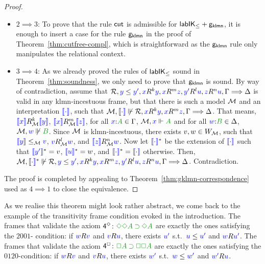 \documentclass[a4paper]{article}
\begin{document}
\begin{proof}
\begin{itemize}
		\item $2 \implies 3$:
		To prove that the rule $\rn{cut}$ is admissible for $\labIKp + \gklmn$, it is enough to insert a case for the rule $\gklmn$ in the proof of Theorem~\ref{thm:cutfree-compl}, which
		is straightforward as the $\gklmn$ rule only manipulates the relational context.
		
		\item $3 \implies 4$:
		As we already proved the rules of $\labIKp$ sound in Theorem~\ref{thm:soundness}, we only need to prove that $\gklmn$ is sound.
		By way of contradiction, assume that $\B, \futs{y}{y'}, \lb x R^{k} \lb y, \lb x R^{m} \lb z, \lb{y'}R^{l} \lb u, \lb z R^{n} \lb u, \Left\SEQ\Right$ is valid in any klmn-incestuous frame,
		but that there is such a model $\M$ and an interpretation $\inter\cdot$, such
		that $\M,\inter\cdot\not\Vdash\B, \lb x R^{k} \lb y, \lb x R^{m} \lb z, \Left \SEQ \Right$.
		That means, $\inter x \rel_\M^k \inter y$, $\inter x \rel_\M^m\inter z$, for all $\labels{x}{A} \in \Left$, $\cforce \M xA$ and for all $\labels wB\in\Right$,
		$\cnforce \M wB$. 
		Since $\M$ is klmn-incestuous, there exists $v,w\in W_\M$, such that $\inter y \le_\M \lb{v}$, $\lb{v} R_\M^l \lb{w}$, and $\inter z R_\M^n \lb{w}$.
		Now let $\inter\cdot^*$ be the extension of $\inter\cdot$ such that $\inter{y'}^* = v$, $\inter{u}^* = w$, and $\inter\cdot^* = \inter\cdot$ otherwise.
		Then, $ \nforce \M {\inter\cdot^*} {\B, \futs{y}{y'}, \lb x R^{k} \lb y, \lb x R^{m} \lb z, \lb{y'}R^{l} \lb u, \lb z R^{n} \lb u, \Left\SEQ\Right}$. Contradiction.
	\end{itemize}
	
	The proof is completed by appealing to Theorem~\ref{thm:gklmn-correspondence} used as $4 \implies 1$ to close the equivalence.
\end{proof}

%

As we realise this theorem might look rather abstract, we come back to the example of the transitivity frame condition evoked in the introduction.
The frames that validate the axiom $\ax{4^{\DIA}} \colon \fm{\DIA\DIA A \IMP \DIA A}$ are exactly the ones satisfying the $2001$- condition: if $\accs wv$ and $\accs vu$, there exists $\lb{u'}$ s.t.~$\futs{u}{u'}$ and $\accs{w}{u'}$.
The frames that validate the axiom $\ax{4^{\BOX}} \colon \fm{\BOX A \IMP \BOX \BOX A}$ are exactly the ones satisfying the $0120$-condition: if $\accs wv$ and $\accs vu$, there exists $\lb{w'}$ s.t.~$\futs{w}{w'}$ and $\accs{w'}{u}$.
\end{document}
